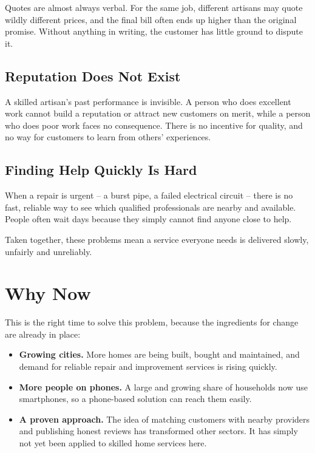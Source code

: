 \documentclass[11pt,a4paper]{article}
\begin{document}
Quotes are almost always verbal. For the same job, different artisans may quote wildly
different prices, and the final bill often ends up higher than the original promise. Without
anything in writing, the customer has little ground to dispute it.

\subsection{Reputation Does Not Exist}

A skilled artisan's past performance is invisible. A person who does excellent work cannot
build a reputation or attract new customers on merit, while a person who does poor work faces
no consequence. There is no incentive for quality, and no way for customers to learn from
others' experiences.

\subsection{Finding Help Quickly Is Hard}

When a repair is urgent -- a burst pipe, a failed electrical circuit -- there is no fast,
reliable way to see which qualified professionals are nearby and available. People often wait
days because they simply cannot find anyone close to help.

Taken together, these problems mean a service everyone needs is delivered slowly, unfairly and
unreliably.

\section{Why Now}

This is the right time to solve this problem, because the ingredients for change are already
in place:

\begin{itemize}[leftmargin=1.5em, label={--}]
    \item \textbf{Growing cities.} More homes are being built, bought and maintained, and
          demand for reliable repair and improvement services is rising quickly.
    \item \textbf{More people on phones.} A large and growing share of households now use
          smartphones, so a phone-based solution can reach them easily.
    \item \textbf{A proven approach.} The idea of matching customers with nearby providers and
          publishing honest reviews has transformed other sectors. It has simply not yet been
          applied to skilled home services here.
\end{itemize}
\end{document}
